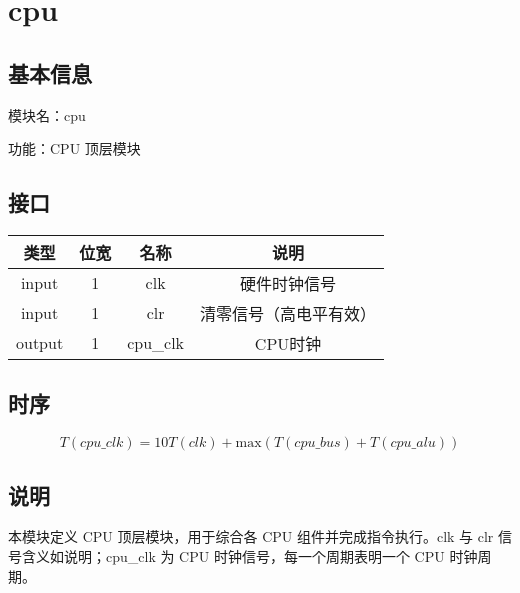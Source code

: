 \section{cpu}
\subsection{基本信息}
模块名：cpu

功能：CPU 顶层模块
\subsection{接口}
\begin{tabular}{|c|c|c|c|}
    \hline
    类型    & 位宽 &   名称    &   说明\\\hline
    input   &  1  &   clk     &   硬件时钟信号\\\hline
    input   &  1  &   clr     &   清零信号（高电平有效）\\\hline
    output  &  1  &   cpu\_clk &   CPU时钟\\\hline
\end{tabular}
\subsection{时序}
    $$T(\textit{cpu\_clk})=10T(\textit{clk})+\text{max}(T(\textit{cpu\_bus})+T(\textit{cpu\_alu}))$$
\subsection{说明}
本模块定义 CPU 顶层模块，用于综合各 CPU 组件并完成指令执行。clk 与 clr 信号含义如说明；cpu\_clk 为 CPU 时钟信号，每一个周期表明一个 CPU 时钟周期。